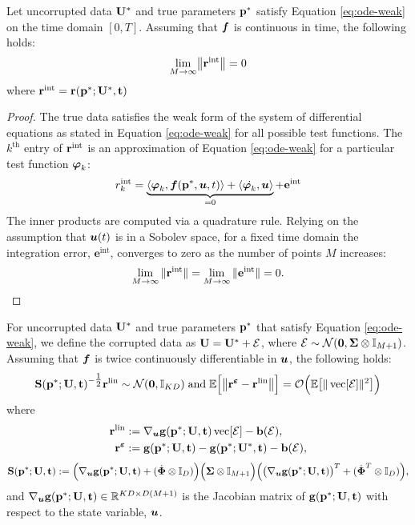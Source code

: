 \begin{proposition} \label{prop:int-error}
	Let uncorrupted data $\mathbf{U}^*$ and true parameters $\mathbf{p}^*$ satisfy Equation \eqref{eq:ode-weak} on the time domain $[0,T]$. Assuming that $\boldsymbol{f}$ is continuous in time, the following holds:
	\[\lim_{M\rightarrow \infty} \bigl\|\mathbf{r}^\mathrm{int}\bigr\| = 0\]
	where \(\mathbf{r}^\mathrm{int} = \mathbf{r}(\mathbf{p}^*;\mathbf{U}^*,\mathbf{t})\)
\end{proposition}
\begin{proof}
	The true data satisfies the weak form of the system of differential equations as stated in Equation \eqref{eq:ode-weak} for all possible test functions. The $k^\text{th}$ entry of $\mathbf{r}^\mathrm{int}$ is an approximation of Equation \eqref{eq:ode-weak} for a particular test function $\boldsymbol{\varphi}_k$:
	\[r^{\text{int}}_k = \underbrace{\langle \boldsymbol{\varphi}_k, \boldsymbol{f}(\mathbf{p}^*, \boldsymbol{u}, t)\rangle + \langle \dot{\boldsymbol{\varphi}_k}, \boldsymbol{u} \rangle}_{=0} + \mathbf{e}^{\text{int} }\] 
	The inner products are computed via a quadrature rule. Relying on the assumption that $\boldsymbol{u}(t)$ is in a Sobolev space, for a fixed time domain the integration error, $\mathbf{e}^\text{int}$, converges to zero as the number of points $M$ increases:
	\[\lim_{M\rightarrow\infty} \|\mathbf{r}^\mathrm{int}\| = \lim_{M\rightarrow\infty} \|\mathbf{e}^{\text{int}}\| = 0.\]
\end{proof}

\begin{proposition} \label{prop:noise}
	For uncorrupted  data $\mathbf{U}^*$ and true parameters $\mathbf{p}^*$ that satisfy Equation \eqref{eq:ode-weak}, we define the corrupted data as $\mathbf{U} = \mathbf{U}^* + \mathbf{\mathcal{E}}$, where $\mathbf{\mathcal{E}} \sim \mathcal{N}(\mathbf{0},  \mathbf{\Sigma} \otimes \mathbb{I}_{M+1})$. Assuming that $\boldsymbol{f}$ is twice continuously differentiable in $\boldsymbol{u}$, the following holds:
	\[\mathbf{S}(\mathbf{p}^*;\mathbf{U},\mathbf{t})^{-\tfrac{1}{2}} \mathbf{r}^{\mathrm{lin}} \sim \mathcal{N}({\mathbf{0}},\mathbb{I}_{KD}) \; \mathrm{and} \; \mathbb{E}\Bigl[\bigl\|\mathbf{r}^{\boldsymbol{\varepsilon}} - \mathbf{r}^{\mathrm{lin}}\bigr\|\Bigr] = \mathcal{O}\Bigl(\mathbb{E}\bigl[\|\operatorname{vec}[\mathbf{\mathcal{E}}]\|^2\bigr]
	\Bigr) \] where 
	\begin{align*}
		\mathbf{r}^{\mathrm{lin}} &:= \nabla_{\boldsymbol{u}} \mathbf{g}(\mathbf{p}^*;\mathbf{U},\mathbf{t})\operatorname{vec}[\mathbf{\mathcal{E}}] - \mathbf{b}(\mathbf{\mathcal{E}}), \\
		\mathbf{r}^{\boldsymbol{\varepsilon}} &:= \mathbf{g}(\mathbf{p}^*; \mathbf{U}, \mathbf{t}) - \mathbf{g}(\mathbf{p}^*; \mathbf{U}^*,\mathbf{t}) -\mathbf{b}(\mathbf{\mathcal{E}}),
	\end{align*}
	\[\mathbf{S}(\mathbf{p}^*;\mathbf{U},\mathbf{t}) := \Bigl(\nabla_{\boldsymbol{u}} \mathbf{g}(\mathbf{p}^*;\mathbf{U},\mathbf{t}) + (\dot{\boldsymbol{\Phi}} \otimes \mathbb{I}_D) \Bigr) \Bigl(  \mathbf{\Sigma} \otimes \mathbb{I}_{M+1} \Bigr) \Bigl(\bigl(\nabla_{\boldsymbol{u}} \mathbf{g}(\mathbf{p}^*;\mathbf{U},\mathbf{t})\bigr)^T + (\dot{\boldsymbol{\Phi}}^T \otimes \mathbb{I}_D)\Bigr),\]
	and $\nabla_{\boldsymbol{u}} \mathbf{g}(\mathbf{p}^*;\mathbf{U},\mathbf{t}) \in \mathbb{R}^{KD \times D(M+1)}$ is the Jacobian matrix of $\mathbf{g}(\mathbf{p}^*;\mathbf{U},\mathbf{t})$ with respect to the state variable, $\boldsymbol{u}$.
\end{proposition}

